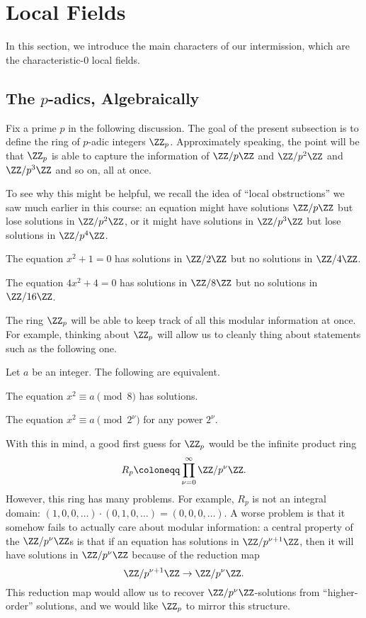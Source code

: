\documentclass[../notes.tex]{subfiles}
\begin{document}
\section{Local Fields}

In this section, we introduce the main characters of our intermission, which are the characteristic-$0$ local fields.

\subsection{The \texorpdfstring{$p$}{ p}-adics, Algebraically}
Fix a prime $p$ in the following discussion. The goal of the present subsection is to define the ring of $p$-adic integers $\ZZ_p$. Approximately speaking, the point will be that $\ZZ_p$ is able to capture the information of $\ZZ/p\ZZ$ and $\ZZ/p^2\ZZ$ and $\ZZ/p^3\ZZ$ and so on, all at once.

To see why this might be helpful, we recall the idea of ``local obstructions'' we saw much earlier in this course: an equation might have solutions $\ZZ/p\ZZ$ but lose solutions in $\ZZ/p^2\ZZ$, or it might have solutions in $\ZZ/p^3\ZZ$ but lose solutions in $\ZZ/p^4\ZZ$.
\begin{example}
	The equation $x^2+1=0$ has solutions in $\ZZ/2\ZZ$ but no solutions in $\ZZ/4\ZZ$.
\end{example}
\begin{example}
	The equation $4x^2+4=0$ has solutions in $\ZZ/8\ZZ$ but no solutions in $\ZZ/16\ZZ$.
\end{example}
The ring $\ZZ_p$ will be able to keep track of all this modular information at once. For example, thinking about $\ZZ_p$ will allow us to cleanly thing about statements such as the following one.
\begin{proposition}
	Let $a$ be an integer. The following are equivalent.
	\begin{listalph}
		\item The equation $x^2\equiv a\pmod 8$ has solutions.
		\item The equation $x^2\equiv a\pmod{2^\nu}$ for any power $2^\nu$.
	\end{listalph}
\end{proposition}
With this in mind, a good first guess for $\ZZ_p$ would be the infinite product ring
\[R_p\coloneqq\prod_{\nu=0}^\infty\ZZ/p^\nu\ZZ.\]
However, this ring has many problems. For example, $R_p$ is not an integral domain: $(1,0,0,\ldots)\cdot(0,1,0,\ldots)=(0,0,0,\ldots)$. A worse problem is that it somehow fails to actually care about modular information: a central property of the $\ZZ/p^\nu\ZZ$s is that if an equation has solutions in $\ZZ/p^{\nu+1}\ZZ$, then it will have solutions in $\ZZ/p^\nu\ZZ$ because of the reduction map
\begin{equation}
	\ZZ/p^{\nu+1}\ZZ\to\ZZ/p^\nu\ZZ. \label{eq:zpz-proj}
\end{equation}
This reduction map would allow us to recover $\ZZ/p^\nu\ZZ$-solutions from ``higher-order'' solutions, and we would like $\ZZ_p$ to mirror this structure.
\end{document}

